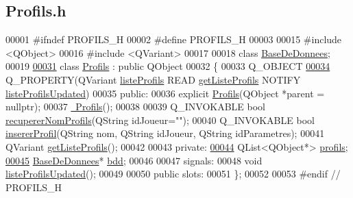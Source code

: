 \hypertarget{_profils_8h_source}{}\subsection{Profils.\+h}
\label{_profils_8h_source}

\begin{DoxyCode}
00001 \textcolor{preprocessor}{#ifndef PROFILS\_H}
00002 \textcolor{preprocessor}{#define PROFILS\_H}
00003 
00015 \textcolor{preprocessor}{#include <QObject>}
00016 \textcolor{preprocessor}{#include <QVariant>}
00017 
00018 \textcolor{keyword}{class }\hyperlink{class_base_de_donnees}{BaseDeDonnees};
00019 
\hyperlink{class_profils}{00031} \textcolor{keyword}{class }\hyperlink{class_profils}{Profils} : \textcolor{keyword}{public} QObject
00032 \{
00033     Q\_OBJECT
\hyperlink{class_profils_a0aac746ed598eec04e440e0825a191a1}{00034}     Q\_PROPERTY(QVariant \hyperlink{class_profils_a0aac746ed598eec04e440e0825a191a1}{listeProfils} READ \hyperlink{class_profils_aca3d2255478f977eaa84ffa3eea920b1}{getListeProfils} NOTIFY 
      \hyperlink{class_profils_a8facf83b130f6583c9a29670faca948b}{listeProfilsUpdated})
00035 \textcolor{keyword}{public}:
00036     \textcolor{keyword}{explicit} \hyperlink{class_profils_abe936fbdac7c189d93aca3fcd8f6c7e6}{Profils}(QObject *parent = \textcolor{keyword}{nullptr});
00037     \hyperlink{class_profils_a71dfd5d2637dd4020a75e18fe08a8d5a}{~Profils}();
00038 
00039     Q\_INVOKABLE \textcolor{keywordtype}{bool} \hyperlink{class_profils_afe85f77aead9a7ea2f09f676d6e2c663}{recupererNomProfils}(QString idJoueur=\textcolor{stringliteral}{""});
00040     Q\_INVOKABLE \textcolor{keywordtype}{bool} \hyperlink{class_profils_ae560041d0af81c5b77a8448d78122d04}{insererProfil}(QString nom, QString idJoueur, QString idParametres);
00041     QVariant \hyperlink{class_profils_aca3d2255478f977eaa84ffa3eea920b1}{getListeProfils}();
00042 
00043 \textcolor{keyword}{private}:
\hyperlink{class_profils_ae5de1fe3b6121bec80e3def390b5df15}{00044}     QList<QObject*> \hyperlink{class_profils_ae5de1fe3b6121bec80e3def390b5df15}{profils};
\hyperlink{class_profils_a3703186987f1cd98ec9ca85d43f63fb7}{00045}     \hyperlink{class_base_de_donnees}{BaseDeDonnees}* \hyperlink{class_profils_a3703186987f1cd98ec9ca85d43f63fb7}{bdd};
00046 
00047 signals:
00048     \textcolor{keywordtype}{void} \hyperlink{class_profils_a8facf83b130f6583c9a29670faca948b}{listeProfilsUpdated}();
00049 
00050 \textcolor{keyword}{public} slots:
00051 \};
00052 
00053 \textcolor{preprocessor}{#endif // PROFILS\_H}
\end{DoxyCode}
